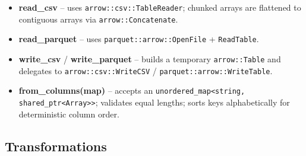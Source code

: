 \documentclass[12pt,a4paper]{article}
\begin{document}
\begin{itemize}[leftmargin=1.5em]
  \item \textbf{read\_csv} -- uses \texttt{arrow::csv::TableReader};
        chunked arrays are flattened to contiguous arrays via
        \texttt{arrow::Concatenate}.
  \item \textbf{read\_parquet} -- uses
        \texttt{parquet::arrow::OpenFile} + \texttt{ReadTable}.
  \item \textbf{write\_csv} / \textbf{write\_parquet} -- builds a
        temporary \texttt{arrow::Table} and delegates to
        \texttt{arrow::csv::WriteCSV} / \texttt{parquet::arrow::WriteTable}.
  \item \textbf{from\_columns(map)} -- accepts an
        \texttt{unordered\_map<string, shared\_ptr<Array>>}; validates equal
        lengths; sorts keys alphabetically for deterministic column order.
\end{itemize}

\subsection{Transformations}
\end{document}

